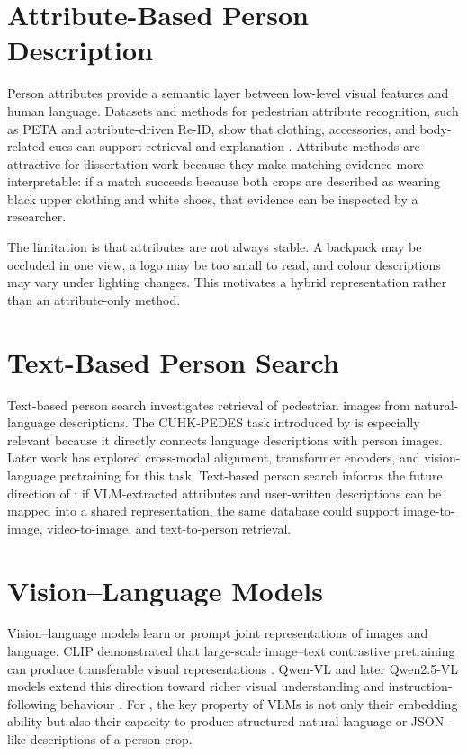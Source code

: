\section{Attribute-Based Person Description}

Person attributes provide a semantic layer between low-level visual features and human language. Datasets and methods for pedestrian attribute recognition, such as PETA and attribute-driven Re-ID, show that clothing, accessories, and body-related cues can support retrieval and explanation \citep{deng2014pedestrian,su2016deep}. Attribute methods are attractive for dissertation work because they make matching evidence more interpretable: if a match succeeds because both crops are described as wearing black upper clothing and white shoes, that evidence can be inspected by a researcher.

The limitation is that attributes are not always stable. A backpack may be occluded in one view, a logo may be too small to read, and colour descriptions may vary under lighting changes. This motivates a hybrid representation rather than an attribute-only method.

\section{Text-Based Person Search}

Text-based person search investigates retrieval of pedestrian images from natural-language descriptions. The CUHK-PEDES task introduced by \citet{li2017personsearch} is especially relevant because it directly connects language descriptions with person images. Later work has explored cross-modal alignment, transformer encoders, and vision-language pretraining for this task. Text-based person search informs the future direction of \systemname: if VLM-extracted attributes and user-written descriptions can be mapped into a shared representation, the same database could support image-to-image, video-to-image, and text-to-person retrieval.

\section{Vision--Language Models}

Vision--language models learn or prompt joint representations of images and language. CLIP demonstrated that large-scale image--text contrastive pretraining can produce transferable visual representations \citep{radford2021learning}. Qwen-VL and later Qwen2.5-VL models extend this direction toward richer visual understanding and instruction-following behaviour \citep{bai2023qwenvl,bai2025qwenvl}. For \systemname, the key property of VLMs is not only their embedding ability but also their capacity to produce structured natural-language or JSON-like descriptions of a person crop.

